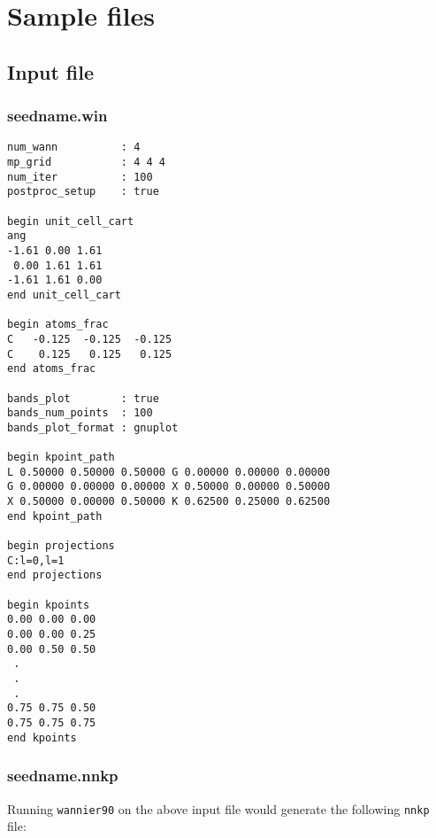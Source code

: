 \chapter{Sample files}

\section{Input file}\label{chap:input}
\subsection{seedname.win}
\begin{verbatim}
num_wann          : 4 
mp_grid           : 4 4 4 
num_iter          : 100
postproc_setup    : true

begin unit_cell_cart
ang
-1.61 0.00 1.61
 0.00 1.61 1.61
-1.61 1.61 0.00
end unit_cell_cart

begin atoms_frac
C   -0.125  -0.125  -0.125
C    0.125   0.125   0.125
end atoms_frac

bands_plot        : true
bands_num_points  : 100
bands_plot_format : gnuplot

begin kpoint_path
L 0.50000 0.50000 0.50000 G 0.00000 0.00000 0.00000
G 0.00000 0.00000 0.00000 X 0.50000 0.00000 0.50000
X 0.50000 0.00000 0.50000 K 0.62500 0.25000 0.62500
end kpoint_path

begin projections
C:l=0,l=1
end projections

begin kpoints
0.00 0.00 0.00
0.00 0.00 0.25
0.00 0.50 0.50
 .
 .
 .
0.75 0.75 0.50
0.75 0.75 0.75
end kpoints

\end{verbatim}

\subsection{seedname.nnkp}
Running \verb#wannier90# on the above input file would generate the
following \verb#nnkp# file: 

